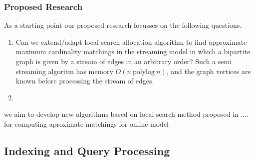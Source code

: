 \documentclass{scrartcl}
\begin{document}
%
% 
%
%
%



\subsubsection{Proposed Research}

As a starting point our proposed research focusses on the following questions.

\begin{enumerate}
\item Can we extend/adapt local search allocation algorithm to find approximate maximum cardinality matchings in the streaming model  in which a bipartite graph is given by a stream of edges in an arbitrary order? Such a semi streaming algoritm has memory $O(n~ \text{polylog} ~n)$, and the graph vertices are known before processing the stream of edges.
\item 
\end{enumerate}



we aim to develop new algorithms based on local search method proposed in .... for computing aproximate matchings for online model



\subsection{Indexing and Query Processing}
\end{document}
